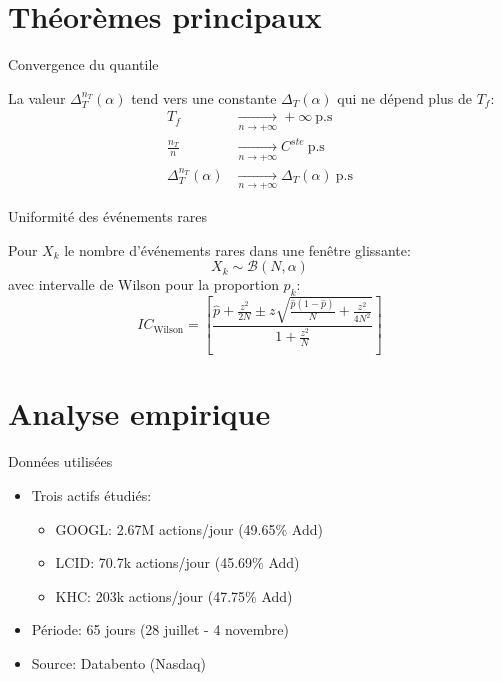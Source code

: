 \documentclass[aspectratio=169]{beamer}  %
\begin{document}
\section{Théorèmes principaux}

\begin{frame}{Convergence du quantile}
    \begin{theorem}
        La valeur $\Delta_T^{n_T}(\alpha)$ tend vers une constante $\Delta_T(\alpha)$ qui ne dépend plus de $T_f$:
        \begin{align*}
            T_f &\underset{n\to +\infty}{\to}+\infty \ \text{p.s} \\
            \frac{n_T}{n} &\underset{n\to +\infty}{\to}C^{ste} \ \text{p.s} \\
            \Delta_T^{n_T}(\alpha) &\underset{n\to +\infty}{\to}\Delta_T(\alpha) \ \text{p.s}
        \end{align*}
    \end{theorem}
\end{frame}

\begin{frame}{Uniformité des événements rares}
    \begin{theorem}
        Pour $X_k$ le nombre d'événements rares dans une fenêtre glissante:
        \[X_k \sim \mathcal{B}(N, \alpha)\]
        avec intervalle de Wilson pour la proportion $p_k$:
        \[IC_{\text{Wilson}} = \left[ \frac{\hat{p} + \frac{z^2}{2N} \pm z \sqrt{\frac{\hat{p}(1-\hat{p})}{N} + \frac{z^2}{4N^2}}}{1 + \frac{z^2}{N}} \right]\]
    \end{theorem}
\end{frame}

\section{Analyse empirique}

\begin{frame}{Données utilisées}
    \begin{itemize}
        \item Trois actifs étudiés:
        \begin{itemize}
            \item GOOGL: 2.67M actions/jour (49.65\% Add)
            \item LCID: 70.7k actions/jour (45.69\% Add)
            \item KHC: 203k actions/jour (47.75\% Add)
        \end{itemize}
        \item Période: 65 jours (28 juillet - 4 novembre)
        \item Source: Databento (Nasdaq)
    \end{itemize}
\end{frame}
\end{document}
